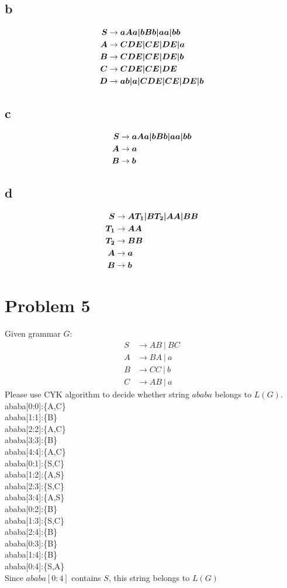 \documentclass[a4paper,UTF8]{ctexart}
\theoremstyle{definition}
\begin{document}
\subsection*{b}
 
\begin{alignat*}{2}
  \boldsymbol{S} &\rightarrow \boldsymbol{aAa|bBb|aa|bb}\\
  \boldsymbol{A} &\rightarrow \boldsymbol{CDE|CE|DE|a}\\
  \boldsymbol{B} &\rightarrow \boldsymbol{CDE|CE|DE|b}\\
  \boldsymbol{C} &\rightarrow \boldsymbol{CDE|CE|DE}\\
  \boldsymbol{D} &\rightarrow \boldsymbol{ab|a|CDE|CE|DE|b}
\end{alignat*}

\subsection*{c}
\begin{alignat*}{2}
  \boldsymbol{S} &\rightarrow \boldsymbol{aAa|bBb|aa|bb}\\
  \boldsymbol{A} &\rightarrow \boldsymbol{a}\\
  \boldsymbol{B} &\rightarrow \boldsymbol{b}\\
\end{alignat*}

\subsection*{d}
\begin{alignat*}{2}
  \boldsymbol{S} &\rightarrow \boldsymbol{AT_1|BT_2|AA|BB}\\
  \boldsymbol{T_1} &\rightarrow \boldsymbol{AA}\\
  \boldsymbol{T_2} &\rightarrow \boldsymbol{BB}\\  
  \boldsymbol{A} &\rightarrow \boldsymbol{a}\\
  \boldsymbol{B} &\rightarrow \boldsymbol{b}\\
\end{alignat*}

\section*{Problem 5}
Given grammar $G$:
\[
	\begin{aligned}
		S & \rightarrow AB\ |\ BC \\
		A & \rightarrow BA\ |\ a  \\
		B & \rightarrow CC\ |\ b  \\
		C & \rightarrow AB\ |\ a
	\end{aligned}
\]
Please use CYK algorithm to decide whether string $ababa$ belongs to $L(G)$.
\newcommand{\cyk}[3]{ababa[#1:#2]:\{#3\}\\}\\
\cyk{0}{0}{A,C}
\cyk{1}{1}{B}
\cyk{2}{2}{A,C}
\cyk{3}{3}{B}
\cyk{4}{4}{A,C}
\cyk{0}{1}{S,C}
\cyk{1}{2}{A,S}
\cyk{2}{3}{S,C}
\cyk{3}{4}{A,S}
\cyk{0}{2}{B}
\cyk{1}{3}{S,C}
\cyk{2}{4}{B}
\cyk{0}{3}{B}
\cyk{1}{4}{B}
\cyk{0}{4}{S,A}
Since $ababa[0:4]$ contains $S$, this string belongs to $L(G)$
\end{document}
